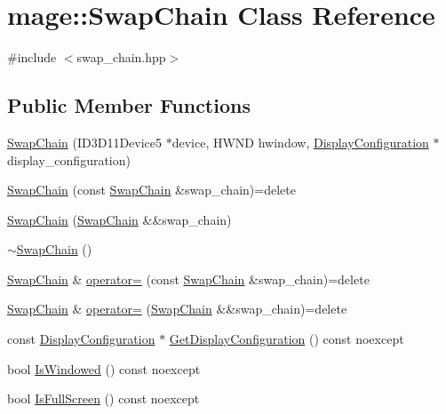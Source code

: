 \hypertarget{classmage_1_1_swap_chain}{}\section{mage\+:\+:Swap\+Chain Class Reference}
\label{classmage_1_1_swap_chain}


{\ttfamily \#include $<$swap\+\_\+chain.\+hpp$>$}

\subsection*{Public Member Functions}
\begin{DoxyCompactItemize}
\item 
\hyperlink{classmage_1_1_swap_chain_a2ba9364220d9f8fa03b5bd99318d32dc}{Swap\+Chain} (I\+D3\+D11\+Device5 $\ast$device, H\+W\+ND hwindow, \hyperlink{structmage_1_1_display_configuration}{Display\+Configuration} $\ast$display\+\_\+configuration)
\item 
\hyperlink{classmage_1_1_swap_chain_a85d5da233182a273705b4fa1c419a0aa}{Swap\+Chain} (const \hyperlink{classmage_1_1_swap_chain}{Swap\+Chain} \&swap\+\_\+chain)=delete
\item 
\hyperlink{classmage_1_1_swap_chain_add0b68e7ce2f6eb857a4ad9c7e01eb83}{Swap\+Chain} (\hyperlink{classmage_1_1_swap_chain}{Swap\+Chain} \&\&swap\+\_\+chain)
\item 
\hyperlink{classmage_1_1_swap_chain_a853168cba69cadc3d8c10ad2f4939e72}{$\sim$\+Swap\+Chain} ()
\item 
\hyperlink{classmage_1_1_swap_chain}{Swap\+Chain} \& \hyperlink{classmage_1_1_swap_chain_a8ea6de219f37d447487d7d3b4bbd5867}{operator=} (const \hyperlink{classmage_1_1_swap_chain}{Swap\+Chain} \&swap\+\_\+chain)=delete
\item 
\hyperlink{classmage_1_1_swap_chain}{Swap\+Chain} \& \hyperlink{classmage_1_1_swap_chain_a4335d4e0869c43a66bfce5f2d0d6f34c}{operator=} (\hyperlink{classmage_1_1_swap_chain}{Swap\+Chain} \&\&swap\+\_\+chain)=delete
\item 
const \hyperlink{structmage_1_1_display_configuration}{Display\+Configuration} $\ast$ \hyperlink{classmage_1_1_swap_chain_afb7cf408081f09d0241f3e764a047e74}{Get\+Display\+Configuration} () const noexcept
\item 
bool \hyperlink{classmage_1_1_swap_chain_a7cf71ec46d0af888b9b1daa890a54d39}{Is\+Windowed} () const noexcept
\item 
bool \hyperlink{classmage_1_1_swap_chain_a85873ca586fbcd83c237692a011d6d08}{Is\+Full\+Screen} () const noexcept

\end{DoxyCompactItemize}
